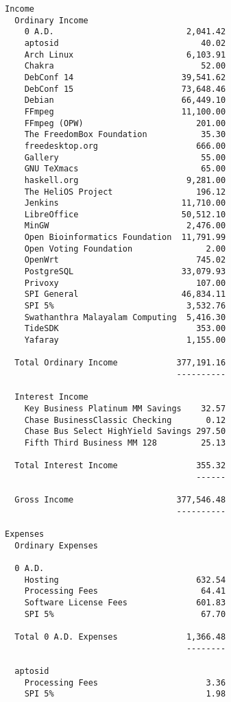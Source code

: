 \documentclass[letterpaper]{report}
\begin{document}
\begin{verbatim}
Income
  Ordinary Income
    0 A.D.                           2,041.42
    aptosid                             40.02
    Arch Linux                       6,103.91
    Chakra                              52.00
    DebConf 14                      39,541.62
    DebConf 15                      73,648.46
    Debian                          66,449.10
    FFmpeg                          11,100.00
    FFmpeg (OPW)                       201.00
    The FreedomBox Foundation           35.30
    freedesktop.org                    666.00
    Gallery                             55.00
    GNU TeXmacs                         65.00
    haskell.org                      9,281.00
    The HeliOS Project                 196.12
    Jenkins                         11,710.00
    LibreOffice                     50,512.10
    MinGW                            2,476.00
    Open Bioinformatics Foundation  11,791.99
    Open Voting Foundation               2.00
    OpenWrt                            745.02
    PostgreSQL                      33,079.93
    Privoxy                            107.00
    SPI General                     46,834.11
    SPI 5%                           3,532.76
    Swathanthra Malayalam Computing  5,416.30
    TideSDK                            353.00
    Yafaray                          1,155.00

  Total Ordinary Income            377,191.16
                                   ----------

  Interest Income
    Key Business Platinum MM Savings    32.57
    Chase BusinessClassic Checking       0.12
    Chase Bus Select HighYield Savings 297.50
    Fifth Third Business MM 128         25.13

  Total Interest Income                355.32
                                       ------

  Gross Income                     377,546.48
                                   ----------
 
Expenses
  Ordinary Expenses

  0 A.D.
    Hosting                            632.54
    Processing Fees                     64.41
    Software License Fees              601.83
    SPI 5%                              67.70

  Total 0 A.D. Expenses              1,366.48
                                     --------

  aptosid
    Processing Fees                      3.36
    SPI 5%                               1.98


\end{verbatim}
\end{document}
